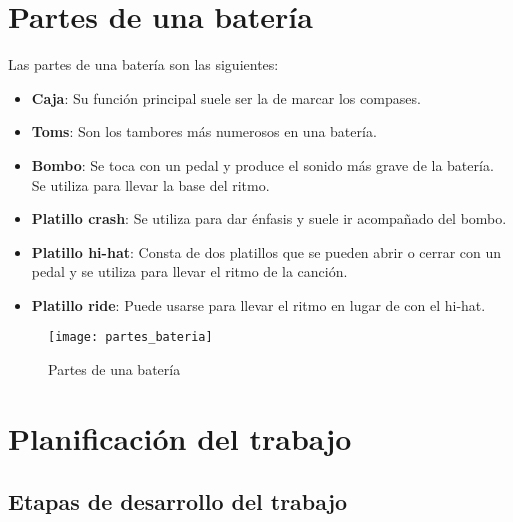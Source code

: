 
    \section{Partes de una batería} %
    \label{sec:PartesDeUnaBateria}

        Las partes de una batería son las siguientes:

        \begin{itemize}
            \item \textbf{Caja}: Su función principal suele ser la de marcar los compases.
            \item \textbf{Toms}: Son los tambores más numerosos en una batería.
            \item \textbf{Bombo}: Se toca con un pedal y produce el sonido más grave de la batería. Se utiliza para
            llevar la base del ritmo.
            \item \textbf{Platillo crash}: Se utiliza para dar énfasis y suele ir acompañado del bombo.
            \item \textbf{Platillo hi-hat}: Consta de dos platillos que se pueden abrir o cerrar con un pedal y se
            utiliza para llevar el ritmo de la canción.
            \item \textbf{Platillo ride}: Puede usarse para llevar el ritmo en lugar de con el hi-hat.
        \end{itemize}

        \begin{figure}[ht]
            \centering
            \texttt{[image: partes\_bateria]}
            \caption{Partes de una batería \cite{partes_bateria_fuente}\label{fig:PartesBateria}}
        \end{figure}


    \section{Planificación del trabajo} %
    \label{sec:PlanificacionDelTrabajo}

        \subsection{Etapas de desarrollo del trabajo} %
        \label{sub:EtapasDeDesarrolloDelTrabajo}

